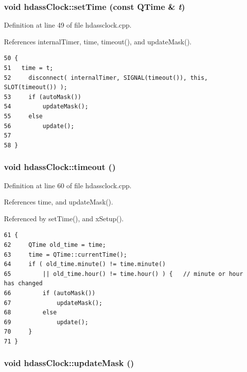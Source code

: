 \subsubsection{\setlength{\rightskip}{0pt plus 5cm}void hdass\-Clock::set\-Time (const QTime \& {\em t})\hspace{0.3cm}{\tt  [slot]}}\label{classhdassClock_hdassClocki0}




Definition at line 49 of file hdassclock.cpp.

References internal\-Timer, time, timeout(), and update\-Mask().



\footnotesize\begin{verbatim}50 {
51   time = t;
52     disconnect( internalTimer, SIGNAL(timeout()), this, SLOT(timeout()) );
53     if (autoMask())
54         updateMask();
55     else
56         update();
57  
58 }
\end{verbatim}\normalsize 
{}
\subsubsection{\setlength{\rightskip}{0pt plus 5cm}void hdass\-Clock::timeout ()\hspace{0.3cm}{\tt  [private, slot]}}\label{classhdassClock_hdassClockk0}




Definition at line 60 of file hdassclock.cpp.

References time, and update\-Mask().

Referenced by set\-Time(), and x\-Setup().



\footnotesize\begin{verbatim}61 {
62     QTime old_time = time;
63     time = QTime::currentTime();
64     if ( old_time.minute() != time.minute() 
65         || old_time.hour() != time.hour() ) {   // minute or hour has changed
66         if (autoMask())
67             updateMask();
68         else
69             update();
70     }
71 }
\end{verbatim}\normalsize 
{}
\subsubsection{\setlength{\rightskip}{0pt plus 5cm}void hdass\-Clock::update\-Mask ()\hspace{0.3cm}{\tt  [protected]}}\label{classhdassClock_hdassClockb0}




